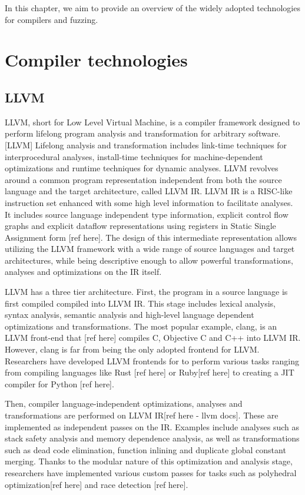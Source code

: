 In this chapter, we aim to provide an overview of the widely adopted technologies for compilers and fuzzing.

\section{Compiler technologies}
\subsection{LLVM}
LLVM, short for Low Level Virtual Machine, is a compiler framework designed to perform lifelong program analysis and transformation for arbitrary software. [LLVM]
Lifelong analysis and transformation includes link-time techniques for interprocedural analyses, install-time techniques for machine-dependent optimizations and runtime techniques for dynamic analyses.
LLVM revolves around a common program representation independent from both the source language and the target architecture, called LLVM IR.
LLVM IR is a RISC-like instruction set enhanced with some high level information to facilitate analyses.
It includes source language independent type information, explicit control flow graphs and explicit dataflow representations using registers in Static Single Assignment form [ref here].
The design of this intermediate representation allows utilizing the LLVM framework with a wide range of source languages and target architectures, while being descriptive enough to allow powerful transformations, analyses and optimizations on the IR itself.

LLVM has a three tier architecture. First, the program in a source language is first compiled compiled into LLVM IR.
This stage includes lexical analysis, syntax analysis, semantic analysis and high-level language dependent optimizations and transformations.
The most popular example, clang, is an LLVM front-end that [ref here] compiles C, Objective C and C++ into LLVM IR.
However, clang is far from being the only adopted frontend for LLVM.
Researchers have developed LLVM frontends for to perform various tasks ranging from compiling languages like Rust [ref here] or Ruby[ref here] to creating a JIT compiler for Python [ref here].

Then, compiler language-independent optimizations, analyses and transformations are performed on LLVM IR[ref here - llvm docs].
These are implemented as independent passes on the IR.
Examples include analyses such as stack safety analysis and memory dependence analysis, as well as 
transformations such as dead code elimination, function inlining and duplicate global constant merging.
Thanks to the modular nature of this optimization and analysis stage, researchers have implemented various custom passes for tasks such as polyhedral optimization[ref here] and race detection [ref here]. 

